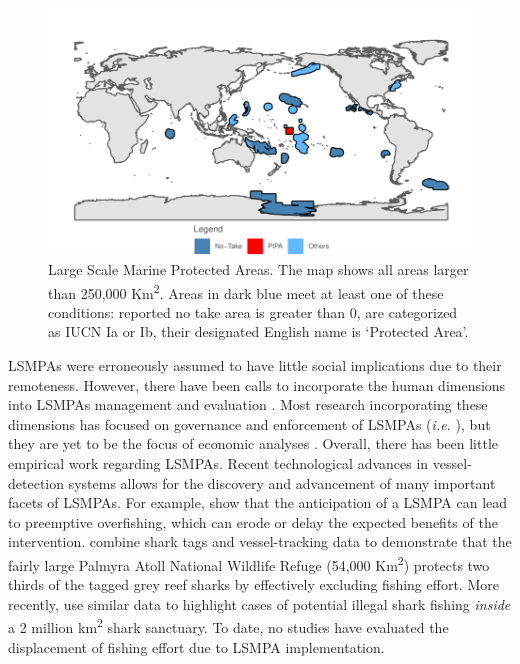 \documentclass[11pt,english]{article}
\begin{document}
\begin{figure}
\centering
\includegraphics{Manuscript_files/figure-latex/unnamed-chunk-2-1.pdf}
\caption{\label{fig:unnamed-chunk-2}\label{fig:LSMPAs_map}Large Scale Marine
Protected Areas. The map shows all areas larger than 250,000
Km\textsuperscript{2}. Areas in dark blue meet at least one of these
conditions: reported no take area is greater than 0, are categorized as
IUCN Ia or Ib, their designated English name is `Protected Area'.}
\end{figure}

LSMPAs were erroneously assumed to have little social implications due
to their remoteness. However, there have been calls to incorporate the
human dimensions into LSMPAs management and evaluation
\citep{agardy_2011,gray_2017}. Most research incorporating these
dimensions has focused on governance and enforcement of LSMPAs
(\emph{i.e.} \citet{alger_2017,christie_2017}), but they are yet to be
the focus of economic analyses \citep{gray_2017}. Overall, there has
been little empirical work regarding LSMPAs. Recent technological
advances in vessel-detection systems allows for the discovery and
advancement of many important facets of LSMPAs. For example,
\citet{mcdermott_2018} show that the anticipation of a LSMPA can lead to
preemptive overfishing, which can erode or delay the expected benefits
of the intervention. \citet{white_2017} combine shark tags and
vessel-tracking data to demonstrate that the fairly large Palmyra Atoll
National Wildlife Refuge (54,000 Km\textsuperscript{2}) protects two
thirds of the tagged grey reef sharks by effectively excluding fishing
effort. More recently, \citep{bradley_2018} use similar data to
highlight cases of potential illegal shark fishing \emph{inside} a 2
million km\textsuperscript{2} shark sanctuary. To date, no studies have
evaluated the displacement of fishing effort due to LSMPA
implementation.
\end{document}
